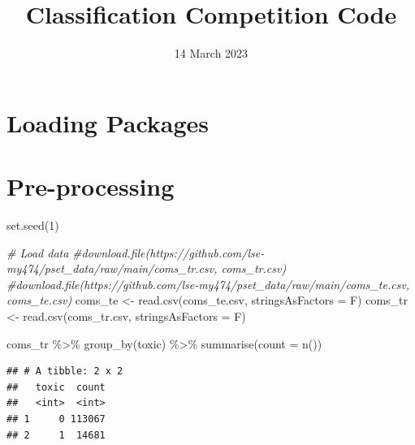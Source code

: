 \documentclass[
]{article}
\title{Classification Competition Code}
\author{}
\date{\vspace{-2.5em}14 March 2023}
\newenvironment{Shaded}{\begin{snugshade}}{\end{snugshade}}
\newcommand{\AttributeTok}[1]{\textcolor[rgb]{0.77,0.63,0.00}{#1}}
\newcommand{\CommentTok}[1]{\textcolor[rgb]{0.56,0.35,0.01}{\textit{#1}}}
\newcommand{\DecValTok}[1]{\textcolor[rgb]{0.00,0.00,0.81}{#1}}
\newcommand{\FunctionTok}[1]{\textcolor[rgb]{0.00,0.00,0.00}{#1}}
\newcommand{\NormalTok}[1]{#1}
\newcommand{\OtherTok}[1]{\textcolor[rgb]{0.56,0.35,0.01}{#1}}
\newcommand{\SpecialCharTok}[1]{\textcolor[rgb]{0.00,0.00,0.00}{#1}}
\newcommand{\StringTok}[1]{\textcolor[rgb]{0.31,0.60,0.02}{#1}}
\begin{document}
\maketitle

\hypertarget{loading-packages}{%
\section{Loading Packages}\label{loading-packages}}

\hypertarget{pre-processing}{%
\section{Pre-processing}\label{pre-processing}}

\begin{Shaded}
\begin{Highlighting}[]
\FunctionTok{set.seed}\NormalTok{(}\DecValTok{1}\NormalTok{)}

\CommentTok{\# Load data}
\CommentTok{\#download.file(\textquotesingle{}https://github.com/lse{-}my474/pset\_data/raw/main/coms\_tr.csv\textquotesingle{}, \textquotesingle{}coms\_tr.csv\textquotesingle{})}
\CommentTok{\#download.file(\textquotesingle{}https://github.com/lse{-}my474/pset\_data/raw/main/coms\_te.csv\textquotesingle{}, \textquotesingle{}coms\_te.csv\textquotesingle{})}
\NormalTok{coms\_te }\OtherTok{\textless{}{-}} \FunctionTok{read.csv}\NormalTok{(}\StringTok{\textquotesingle{}coms\_te.csv\textquotesingle{}}\NormalTok{, }\AttributeTok{stringsAsFactors =}\NormalTok{ F)}
\NormalTok{coms\_tr }\OtherTok{\textless{}{-}} \FunctionTok{read.csv}\NormalTok{(}\StringTok{\textquotesingle{}coms\_tr.csv\textquotesingle{}}\NormalTok{, }\AttributeTok{stringsAsFactors =}\NormalTok{ F)}

\NormalTok{coms\_tr }\SpecialCharTok{\%\textgreater{}\%}
  \FunctionTok{group\_by}\NormalTok{(toxic) }\SpecialCharTok{\%\textgreater{}\%}
  \FunctionTok{summarise}\NormalTok{(}\AttributeTok{count =} \FunctionTok{n}\NormalTok{())}
\end{Highlighting}
\end{Shaded}

\begin{verbatim}
## # A tibble: 2 x 2
##   toxic  count
##   <int>  <int>
## 1     0 113067
## 2     1  14681
\end{verbatim}
\end{document}
